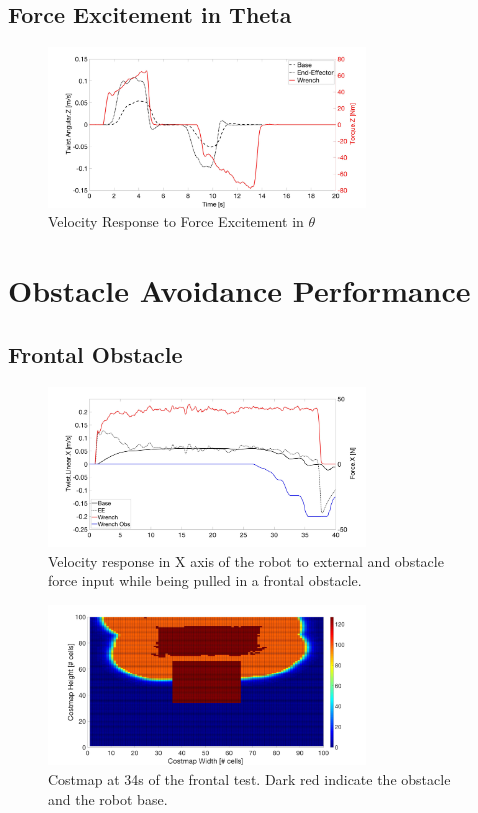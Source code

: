 \subsection{Force Excitement in Theta}
\begin{figure}
   \centering
   \includegraphics[width=0.75\textwidth]{images/test18_theta.jpg}
   \caption{Velocity Response to Force Excitement in $\theta$}
   \label{pics:test18_theta}
\end{figure}

\section{Obstacle Avoidance Performance}
\subsection{Frontal Obstacle}
\begin{figure}
   \centering
   \includegraphics[width=0.75\textwidth]{images/test2.jpg}
   \caption{Velocity response in X axis of the robot to external and obstacle force input while being pulled in a frontal obstacle.}
   \label{pics:test2}
\end{figure}

\begin{figure}
   \centering
   \includegraphics[width=0.75\textwidth]{images/test2_costmap.jpg}
   \caption{Costmap at \unit{34}{s} of the frontal test. Dark red indicate the obstacle and the robot base.}
   \label{pics:test2costmap}
\end{figure}



